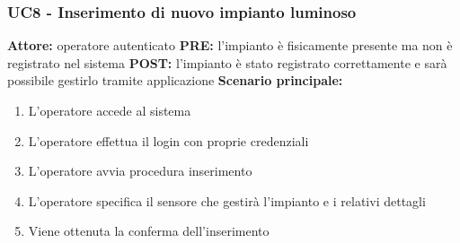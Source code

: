 \documentclass[a4paper, 12pt]{article}
\begin{document}
\subsubsection{UC8 - Inserimento di nuovo impianto luminoso}
\textbf{Attore:} operatore autenticato\newline
\textbf{PRE:} l'impianto è fisicamente presente ma non è registrato nel sistema\newline
\textbf{POST:} l'impianto è stato registrato correttamente e sarà possibile gestirlo tramite applicazione\newline
\textbf{Scenario principale:}
\begin{enumerate}
    \item L'operatore accede al sistema
    \item L'operatore effettua il login con proprie credenziali
    \item L'operatore avvia procedura inserimento
    \item L'operatore specifica il sensore che gestirà l'impianto e i relativi dettagli
    \item Viene ottenuta la conferma dell'inserimento
\end{enumerate}
\end{document}
